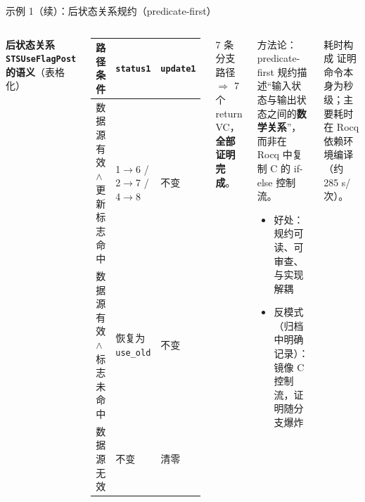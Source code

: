\documentclass[UTF8,aspectratio=169]{ctexbeamer}
\begin{document}
\begin{frame}{示例 1（续）：后状态关系规约（predicate-first）}
  \begin{columns}[T]
    \textbf{后状态关系 \texttt{STSUseFlagPost} 的语义}（表格化）
    \begin{center}\footnotesize
    \begin{tabular}{@{}lll@{}}
      \toprule
      路径条件 & \texttt{status1} & \texttt{update1} \\
      \midrule
      数据源有效 $\wedge$ 更新标志命中 & 1$\to$6 / 2$\to$7 / 4$\to$8 & 不变 \\
      数据源有效 $\wedge$ 标志未命中 & 恢复为 \texttt{use\_old} & 不变 \\
      数据源无效 & 不变 & 清零 \\
      \bottomrule
    \end{tabular}
    \end{center}
    \vspace{4pt}
    {\small 7 条分支路径 $\Rightarrow$ 7 个 return VC，\textbf{全部证明完成}。}
    \begin{block}{方法论：predicate-first}
      \small
      规约描述``输入状态与输出状态之间的\textbf{数学关系}''，而非在 Rocq 中复制 C 的 if-else 控制流。
      \begin{itemize}\footnotesize
        \item 好处：规约可读、可审查、与实现解耦
        \item 反模式（归档中明确记录）：镜像 C 控制流，证明随分支爆炸
      \end{itemize}
    \end{block}
    \begin{block}{耗时构成}
      \small 证明命令本身为秒级；主要耗时在 Rocq 依赖环境编译（约 285 s/次）。
    \end{block}
  \end{columns}
\end{frame}
\end{document}
